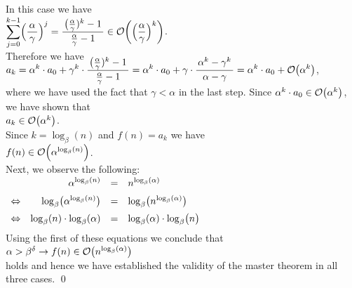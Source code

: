 \begin{enumerate}
      In this case we have
      \\[0.2cm]
      \hspace*{1.3cm}
      $\ds\sum\limits_{j=0}^{k-1} \Bigl(\frac{\,\alpha\,}{\gamma}\Bigr)^j = \bruch{\bigl(\frac{\alpha}{\gamma})^k - 1}{\frac{\alpha}{\gamma} - 1} \in \Oh\biggl(\Bigl(\frac{\alpha}{\gamma}\Bigr)^k\biggr)$.
      \\[0.2cm]
      Therefore we have
      \\[0.2cm]
      \hspace*{1.3cm}
      $\ds a_k = \alpha^k\cdot a_0 + \gamma^k \cdot \bruch{\bigl(\frac{\alpha}{\gamma})^k - 1}{\frac{\alpha}{\gamma} - 1} =
                   \alpha^k\cdot a_0 + \gamma \cdot \bruch{\alpha^k -\gamma^k}{\alpha - \gamma} =
                   \alpha^k\cdot a_0 + \Oh\bigl(\alpha^k\bigr)
      $,
      \\[0.2cm] 
      where we have used the fact that $\gamma < \alpha$ in the last step.
      Since $\alpha^k \cdot a_0 \in \mathcal{O}\bigl(\alpha^k\bigr)$, we have shown that
      \\[0.2cm]
      \hspace*{1.3cm}
      $a_k \in  \mathcal{O}\bigl(\alpha^k\bigr)$.
      \\[0.2cm]
      Since  $k = \log_{\beta}(n)$ and $f(n) = a_k$ we have
      \\[0.2cm]
      \hspace*{1.3cm}
      $f(n) \in \mathcal{O}\Bigl(\alpha^{\log_{\beta}(n)}\Bigr)$.
      \\[0.2cm] 
      Next, we observe the following:
      \\[0.2cm]
      \hspace*{1.3cm}
      $
      \begin{array}[t]{lrcl}
                        & \displaystyle\alpha^{\log_{\beta}(n)} & = & n^{\log_{\beta}(\alpha)} \\[0.2cm]
        \Leftrightarrow & \log_\beta\bigl(\alpha^{\log_{\beta}(n)}\bigr) & = & \log_{\beta}\bigl(n^{\log_{\beta}(\alpha)}\bigr) \\[0.2cm]
        \Leftrightarrow & \log_{\beta}(n) \cdot \log_\beta(\alpha) & = & \log_{\beta}(\alpha) \cdot \log_{\beta}\bigl(n\bigr) \\[0.2cm]      
      \end{array}
      $
      \\[0.2cm]
      Using the first of these equations we conclude that
      \\[0.2cm]
      \hspace*{1.3cm}
      $\alpha > \beta^\delta \rightarrow f(n) \in \mathcal{O}\bigl(n^{\log_{\beta}(\alpha)}\bigr)$
      \\[0.2cm]
      holds and hence we have established the validity of the master theorem in all three cases.  
      \qed
\end{enumerate}

